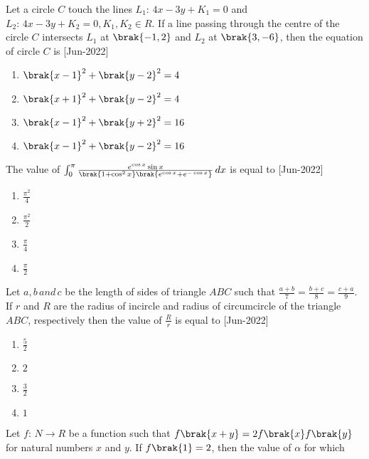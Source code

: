 \iffalse
\title{2022}
\author{EE24BTECH11021}
\section{mcq-single}
\fi
    \item Let a circle $C$ touch the lines $L_1\colon\,4x-3y+K_1=0$ and $L_2\colon\,4x-3y+K_2=0,K_1,K_2\in R.$ If a line passing through the centre of the circle $C$ intersects $L_1$ at $\brak{-1,2}$ and $L_2$ at $\brak{3,-6}$, then the equation of circle $C$ is 
    \hfill{[Jun-2022]}
        \begin{enumerate}
            \item $\brak{x-1}^2+\brak{y-2}^2=4$
            \item $\brak{x+1}^2+\brak{y-2}^2=4$
            \item $\brak{x-1}^2+\brak{y+2}^2=16$
            \item $\brak{x-1}^2+\brak{y-2}^2=16$
        \end{enumerate}
    \item The value of $\int_{0}^{\pi}\frac{e^{\cos{x}}\sin{x}}{\brak{1+\cos^2{x}}\brak{e^{\cos{x}}+e^{-\cos{x}}}} \, dx$ is equal to 
    \hfill{[Jun-2022]}
        \begin{enumerate}
            \item $\frac{\pi^2}{4}$
            \item $\frac{\pi^2}{2}$
            \item $\frac{\pi}{4}$
            \item $\frac{\pi}{2}$
        \end{enumerate}
    \item Let $a,b\,and\,c$ be the length of sides of triangle $ABC$ such that $\frac{a+b}{7}=\frac{b+c}{8}=\frac{c+a}{9}$. If $r$ and $R$ are the radius of incircle and radius of circumcircle of the triangle $ABC$, respectively then the value of $\frac{R}{r}$ is equal to
    \hfill{[Jun-2022]}
        \begin{enumerate}
            \item $\frac{5}{2}$
            \item $2$
            \item $\frac{3}{2}$
            \item $1$
        \end{enumerate}
    \item Let $f\colon\,N \to R$ be a function such that $f\brak{x+y}=2f\brak{x}f\brak{y}$ for natural numbers $x$ and $y$. If $f\brak{1}=2$, then the value of $\alpha$ for which
